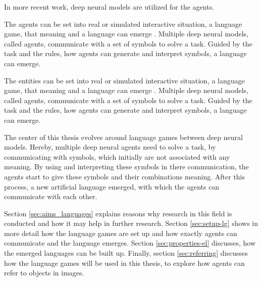 In more recent work, deep neural models are utilized for the agents.


The agents can be set into real or simulated interactive situation, a language game, that meaning and a language can emerge \citep{Kirby2002}.
Multiple deep neural models, called agents, communicate with a set of symbols to solve a task.
Guided by the task and the rules, how agents can generate and interpret symbols, a language can emerge.


The entities can be set into real or simulated interactive situation, a language game, that meaning and a language can emerge \citep{Kirby2002}.
Multiple deep neural models, called agents, communicate with a set of symbols to solve a task.
Guided by the task and the rules, how agents can generate and interpret symbols, a language can emerge.



The center of this thesis evolves around language games between deep neural models.
Hereby, multiple deep neural agents need to solve a task, by communicating with symbols, which initially are not associated with any meaning.
By using and interpreting these symbols in there communication, the agents start to give these symbols and their combinations meaning.
After this process, a new artificial language emerged, with which the agents can communicate with each other.


Section \ref{sec:aims_languages} explains reasons why research in this field is conducted and how it may help in further research.
Section \ref{sec:setup-lg} shows in more detail how the language games are set up and how exactly agents can communicate and the language emerges.
Section \ref{sec:properties-el} discusses, how the emerged languages can be built up.
Finally, section \ref{sec:referring} discusses how the language games will be used in this thesis, to explore how agents can refer to objects in images.

